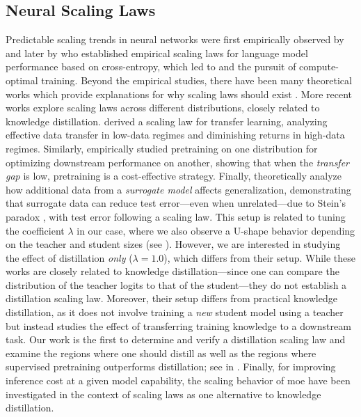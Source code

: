 \subsection{Neural Scaling Laws}
\label{ssec:neural-scaling-laws}
Predictable scaling trends in neural networks were first empirically observed by \citet{DBLP:journals/corr/abs-1712-00409} and
later by \citet{DBLP:journals/corr/abs-2001-08361} who established empirical scaling laws for language model performance based on cross-entropy, which led to \citet{DBLP:journals/corr/abs-2203-15556} and the pursuit of compute-optimal training.
Beyond the empirical studies, there have been many theoretical works which provide explanations for why scaling laws should exist \citep{DBLP:journals/corr/abs-2102-06701,DBLP:journals/corr/abs-2405-15074,DBLP:journals/corr/abs-2411-06646}.
More recent works explore scaling laws across different distributions, closely related to knowledge distillation.
\citet{DBLP:journals/corr/abs-2102-01293} derived a scaling law for transfer learning, analyzing effective data transfer in low-data regimes and diminishing returns in high-data regimes.
Similarly, \citet{DBLP:journals/corr/abs-2408-16947} empirically studied pretraining on one distribution for optimizing downstream performance on another, showing that when the \emph{transfer gap} is low, pretraining is a cost-effective strategy. Finally, \citet{DBLP:journals/corr/abs-2402-04376} theoretically analyze how additional data from a \emph{surrogate model} affects generalization, demonstrating that surrogate data can reduce test error—even when unrelated—due to Stein's paradox \citep{stein1956inadmissibility}, with test error following a scaling law. 
This setup is related to tuning the coefficient $\lambda$ in our case, where we also observe a U-shape behavior depending on the teacher and student sizes (see ). 
However, we are interested in studying the effect of distillation \emph{only} ($\lambda = 1.0$), which differs from their setup. 
While these works are closely related to knowledge distillation—since one can compare the distribution of the teacher logits to that of the student—they do not establish a distillation scaling law. Moreover, their setup differs from practical knowledge distillation, as it does not involve training a \emph{new} student model using a teacher but instead studies the effect of transferring training knowledge to a downstream task.
Our work is the first to determine and verify a distillation scaling law and examine the regions where one should distill as well as the regions where supervised pretraining outperforms distillation; see
 in .
Finally, 
for improving inference cost at a given model capability, the scaling behavior of \gls{moe}
\citep{DBLP:journals/corr/ShazeerMMDLHD17,DBLP:journals/corr/abs-2410-19034}
have been investigated in the context of scaling laws
\citep{DBLP:conf/icml/ClarkCGMPHDHCB022,DBLP:conf/icml/LudziejewskiKAP24,parameters-flops-scaling}
as one alternative to knowledge distillation.


